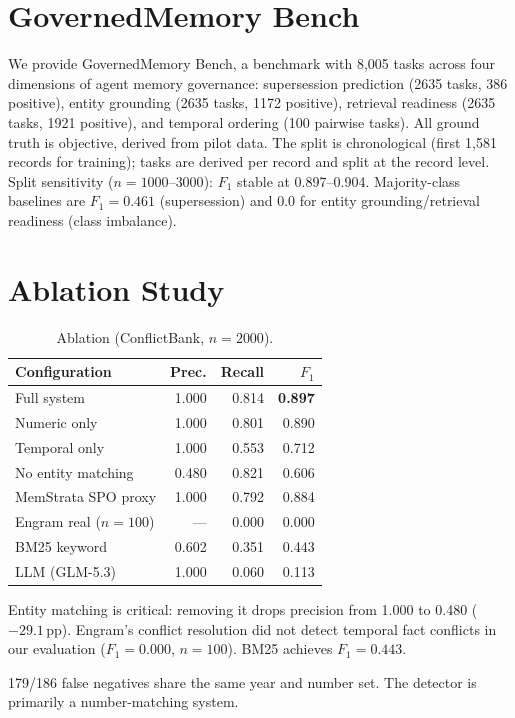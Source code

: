 \documentclass{llncs}
\begin{document}
\section{GovernedMemory Bench}


We provide GovernedMemory Bench, a benchmark with 8{,}005 tasks across four dimensions of agent memory governance: supersession prediction (2{}635 tasks, 386 positive), entity grounding (2{}635 tasks, 1{}172 positive), retrieval readiness (2{}635 tasks, 1{}921 positive), and temporal ordering (100 pairwise tasks). All ground truth is objective, derived from pilot data. The split is chronological (first 1{,}581 records for training); tasks are derived per record and split at the record level. Split sensitivity ($n{=}1000$--$3000$): $F_1$ stable at 0.897--0.904. Majority-class baselines are $F_1{=}0.461$ (supersession) and 0.0 for entity grounding/retrieval readiness (class imbalance).

\section{Ablation Study}

\begin{table}[h]
\centering
\caption{Ablation (ConflictBank, $n{=}2{}000$).}
\begin{tabular}{lrrr}
\toprule
Configuration & Prec. & Recall & $F_1$ \\
\midrule
Full system & 1.000 & 0.814 & \textbf{0.897} \\
Numeric only & 1.000 & 0.801 & 0.890 \\
Temporal only & 1.000 & 0.553 & 0.712 \\
No entity matching & 0.480 & 0.821 & 0.606 \\
MemStrata SPO proxy & 1.000 & 0.792 & 0.884 \\
Engram real ($n{=}100$) & --- & 0.000 & 0.000 \\
BM25 keyword & 0.602 & 0.351 & 0.443 \\
LLM (GLM-5.3) & 1.000 & 0.060 & 0.113 \\
\bottomrule
\end{tabular}
\end{table}

Entity matching is critical: removing it drops precision from 1.000 to 0.480 ($-29.1$\,pp). Engram's conflict resolution did not detect temporal fact conflicts in our evaluation ($F_1{=}0.000$, $n{=}100$). BM25 achieves $F_1{=}0.443$.

179/186 false negatives share the same year and number set. The detector is primarily a number-matching system.
\end{document}
